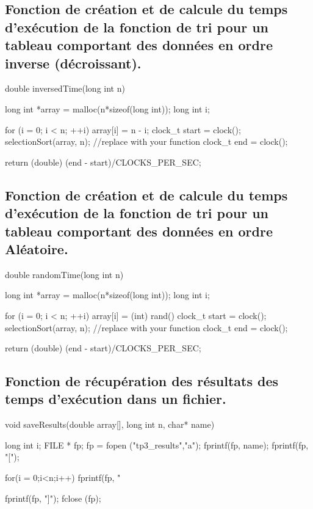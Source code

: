 \documentclass[12pt]{article}
\begin{document}
\subsection{Fonction de création et de calcule du temps d'exécution de la fonction de tri pour un tableau comportant des données en ordre inverse (décroissant). }
\begin{sql}
double inversedTime(long int n) {
    
  long int *array = malloc(n*sizeof(long int));
  long int i;
  
  for (i = 0; i < n; ++i)
  {
    array[i] = n - i;
  }
  clock_t start = clock();
  selectionSort(array, n); //replace with your function 
  clock_t end = clock();

  return (double) (end - start)/CLOCKS_PER_SEC;
}
\end{sql}

\subsection{Fonction de création et de calcule du temps d'exécution de la fonction de tri pour un tableau comportant des données en ordre Aléatoire.}
\begin{sql}
double randomTime(long int n) {
    
  long int *array = malloc(n*sizeof(long int));
  long int i;
  
  for (i = 0; i < n; ++i)
  {
    array[i] = (int) rand()%
  }
  clock_t start = clock();
  selectionSort(array, n); //replace with your function 
  clock_t end = clock();

  return (double) (end - start)/CLOCKS_PER_SEC;
}
\end{sql}

\subsection{Fonction de récupération des résultats des temps d'exécution dans un fichier.}
\begin{sql}
  void saveResults(double array[], long int n, char* name) {

     long int i;
     FILE * fp;
     fp = fopen ("tp3_results","a");
     fprintf(fp, name);
     fprintf(fp, "[");

     for(i = 0;i<n;i++) {
      fprintf(fp, "%
     }

     fprintf(fp, "]\n");
     fclose (fp);
  }
\end{sql}
\end{document}
